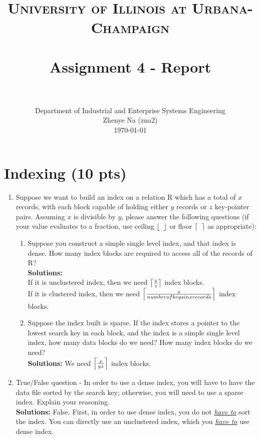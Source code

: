 \documentclass[paper=a4, fontsize=11pt]{scrartcl}
\title{
	\usefont{OT1}{bch}{b}{n}
	\normalfont \normalsize \textsc{University of Illinois at Urbana-Champaign} \\ [25pt]
	\horrule{0.5pt} \\[0.4cm]
	\huge Assignment 4 - Report \\
	\horrule{2pt} \\[0.5cm]
}
\author{
	\normalfont 								\normalsize
	Department of Industrial and Enterprise Systems Engineering\\
	\normalsize Zhenye Na (zna2)\\[-3pt]		\normalsize
	\today
}
\date{}
\DeclarePairedDelimiter\ceil{\lceil}{\rceil}
\DeclarePairedDelimiter\floor{\lfloor}{\rfloor}
\numberwithin{equation}{section}		%
\numberwithin{figure}{section}			%
\numberwithin{table}{section}				%
\begin{document}
	\maketitle
	
	\section{Indexing (10 pts)}
	
	\begin{enumerate}
		\item Suppose we want to build an index on a relation R which has a total of $x$ records, with each block capable of holding either $y$ records or $z$ key-pointer pairs. Assuming $x$ is divisible by $y$, please answer the following questions (if your value evaluates to a fraction, use ceiling $\floor*{\;\;}$ or floor $\ceil*{\;\;}$ as appropriate):
		
		\begin{enumerate}
			\item Suppose you construct a simple single level index, and that index is dense. How many index blocks are required to access all of the records of R?\\
			\textbf{Solutions: }\\
			If it is unclustered index, then we need $\ceil*{\frac{x}{z}}$ index blocks.\\
			If it is clustered index, then we need $\ceil*{\frac{x}{number of keys in x records}}$ index blocks.\\
			
			\item Suppose the index built is sparse. If the index stores a pointer to the lowest search key in each block, and the index is a simple single level index, how many data blocks do we need? How many index blocks do we need?\\
			\textbf{Solutions: }We need $\ceil*{\frac{x}{yz}}$ index blocks.
			
		\end{enumerate}
		
		
		
		\item True/False question - In order to use a dense index, you will have to have the data file sorted by the search key; otherwise, you will need to use a sparse index. Explain your reasoning.\\
		\textbf{Solutions: }False. First, in order to use dense index, you do not \underline{\textit{have to}} sort the index. You can directly use an unclustered index, which you \underline{\textit{have to}} use dense index.
		
		
	\end{enumerate}
	
\end{document}
